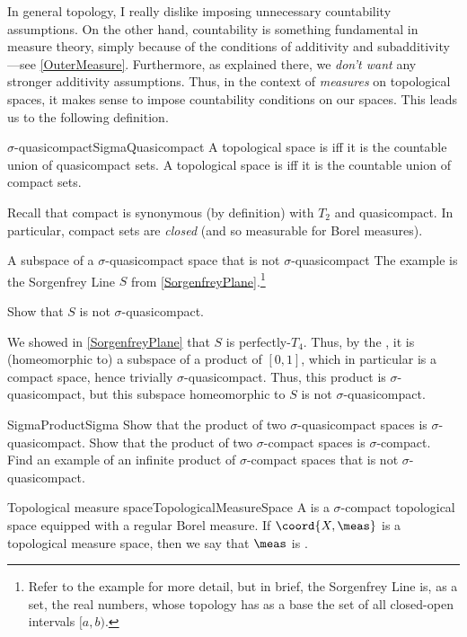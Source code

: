 In general topology, I really dislike imposing unnecessary countability assumptions.  On the other hand, countability is something fundamental in measure theory, simply because of the conditions of additivity and subadditivity---see \cref{OuterMeasure}.  Furthermore, as explained there, we \emph{don't want} any stronger additivity assumptions.  Thus, in the context of \emph{measures} on topological spaces, it makes sense to impose countability conditions on our spaces.  This leads us to the following definition.
\begin{dfn}{$\sigma$-quasicompact}{SigmaQuasicompact}
A topological space is  iff it is the countable union of quasicompact sets.  A topological space is  iff it is the countable union of compact sets.
\begin{rmk}
Recall that compact is synonymous (by definition) with $T_2$ and quasicompact.  In particular, compact sets are \emph{closed} (and so measurable for Borel measures).
\end{rmk}
\end{dfn}
\begin{exm}{A subspace of a $\sigma$-quasicompact space that is not $\sigma$-quasicompact}{}
The example is the Sorgenfrey Line $S$ from \cref{SorgenfreyPlane}.\footnote{Refer to the example for more detail, but in brief, the Sorgenfrey Line is, as a set, the real numbers, whose topology has as a base the set of all closed-open intervals $[a,b)$.}
\begin{exr}{}{}
Show that $S$ is not $\sigma$-quasicompact.
\end{exr}

We showed in \cref{SorgenfreyPlane} that $S$ is perfectly-$T_4$.  Thus, by the , it is (homeomorphic to) a subspace of a product of $[0,1]$, which in particular is a compact space, hence trivially $\sigma$-quasicompact.  Thus, this product is $\sigma$-quasicompact, but this subspace homeomorphic to $S$ is not $\sigma$-quasicompact.
\end{exm}
\begin{exr}{}{SigmaProductSigma}
Show that the product of two $\sigma$-quasicompact spaces is $\sigma$-quasicompact.  Show that the product of two $\sigma$-compact spaces is $\sigma$-compact.  Find an example of an infinite product of $\sigma$-compact spaces that is not $\sigma$-quasicompact.
\end{exr}
\begin{dfn}{Topological measure space}{TopologicalMeasureSpace}
A  is a $\sigma$-compact topological space equipped with a regular Borel measure.  If $\coord{X,\meas}$ is a topological measure space, then we say that $\meas$ is .
\end{dfn}
